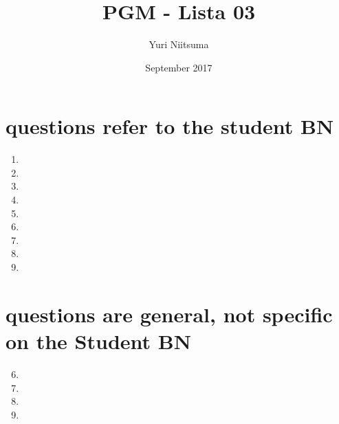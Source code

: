 \documentclass{IEEEtran}
\title{PGM - Lista 03}
\author{Yuri Niitsuma}
\date{September 2017}
\begin{document}
\maketitle

\section{questions refer to the student BN}

\begin{enumerate}
    \item
    
    \item
    
    \item
    
    \item
    
    \item
    
    \item
    
    \item
    
    \item
    
    \item
    
\end{enumerate}

\section{questions are general, not specific on the Student BN}

\begin{enumerate}
    \setcounter{enumi}{5}
    \item
    
    \item
    
    \item
    
    \item
    
\end{enumerate}
\end{document}
